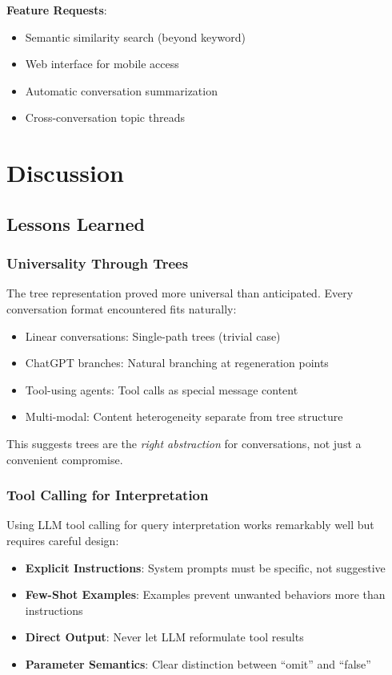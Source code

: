 \documentclass[11pt,letterpaper]{article}
\begin{document}
\textbf{Feature Requests}:
\begin{itemize}
    \item Semantic similarity search (beyond keyword)
    \item Web interface for mobile access
    \item Automatic conversation summarization
    \item Cross-conversation topic threads
\end{itemize}

\section{Discussion}
\label{sec:discussion}

\subsection{Lessons Learned}

\subsubsection{Universality Through Trees}

The tree representation proved more universal than anticipated. Every conversation format encountered fits naturally:

\begin{itemize}
    \item Linear conversations: Single-path trees (trivial case)
    \item ChatGPT branches: Natural branching at regeneration points
    \item Tool-using agents: Tool calls as special message content
    \item Multi-modal: Content heterogeneity separate from tree structure
\end{itemize}

This suggests trees are the \emph{right abstraction} for conversations, not just a convenient compromise.

\subsubsection{Tool Calling for Interpretation}

Using LLM tool calling for query interpretation works remarkably well but requires careful design:

\begin{itemize}
    \item \textbf{Explicit Instructions}: System prompts must be specific, not suggestive
    \item \textbf{Few-Shot Examples}: Examples prevent unwanted behaviors more than instructions
    \item \textbf{Direct Output}: Never let LLM reformulate tool results
    \item \textbf{Parameter Semantics}: Clear distinction between ``omit'' and ``false''
\end{itemize}
\end{document}
